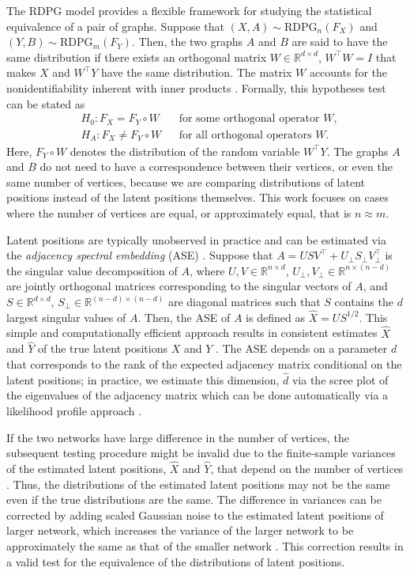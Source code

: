 The RDPG model provides a flexible framework for studying the statistical equivalence of a pair of graphs. Suppose that $(X,A)\sim\text{RDPG}_n(F_X)$ and $(Y,B)\sim\text{RDPG}_m(F_Y)$. 
Then, the two graphs $A$ and $B$ are said to have the same distribution if there exists an orthogonal matrix $W\in\mathbb{R}^{d\times d}$, $W^\top W = I$ that makes $X$ and $W^\top Y$ have the same distribution. 
The matrix $W$ accounts for the nonidentifiability inherent with inner products \cite{tang2014nonparametric}. 
Formally, this hypotheses test can be stated as 
  \begin{align*}
    &H_0 : F_X = F_Y \circ {W}
    && \text{for some orthogonal operator } {W},\\
       &H_A : F_X \neq F_Y \circ {W}
    && \text{for all orthogonal operators } {W}.
  \end{align*}
Here, $F_Y\circ W$ denotes the distribution of the random variable $W^\top Y$. 
The graphs $A$ and $B$ do not need to have a correspondence between their vertices, or even
the same number of vertices, because we are comparing distributions of latent
positions instead of the latent positions themselves. 
This work focuses on cases where the number of vertices are equal, or approximately equal, that is $n \approx m$. 

Latent positions are typically unobserved in practice and can be estimated via the \textit{adjacency spectral embedding} (ASE) \cite{ase-consistency-1}.
Suppose that $A= USV^\top + U_\perp S_\perp V^\top_\perp$ is the singular value decomposition of $A$, where $U,V\in\mathbb{R}^{n\times d}$, $U_\perp,V_\perp\in\mathbb{R}^{n\times(n-d)}$ are jointly orthogonal matrices
corresponding to the singular vectors of $A$, and $S\in\mathbb{R}^{d\times d}$,
$S_\perp\in\mathbb{R}^{(n-d)\times (n-d)}$ are diagonal matrices such that $S$
contains the $d$ largest singular values of $A$. 
Then, the ASE of $A$ is defined as $\hat{X}=US^{1/2}$. This simple and computationally efficient approach results in consistent estimates $\hat{X}$ and $\hat{Y}$ of the true latent positions $X$ and $Y$ \cite{ase-consistency-1,ase-consistency-2, ase-consistency-3}.
The ASE depends on a parameter $d$ that corresponds to the rank of the expected adjacency matrix conditional on the latent positions; in practice, we estimate this dimension, $\hat d$ via the scree plot of the eigenvalues of the adjacency matrix which can be done automatically via a likelihood profile approach \cite{zhu2006automatic}.

If the two networks have large difference in the number of vertices, the subsequent testing procedure might be invalid due to the finite-sample variances of the estimated latent positions, $\hat{X}$ and $\hat Y$, that depend on the number of vertices \cite{Athreya2015}. Thus, the distributions of the estimated latent positions may not be the same even if the true distributions are the same. The difference in variances can be corrected by adding scaled Gaussian noise to the estimated latent positions of larger network, which increases the variance of the larger network to be approximately the same as that of the smaller network \cite{correcting-nonpar}. This correction results in a valid test for the equivalence of the distributions of latent positions. 


